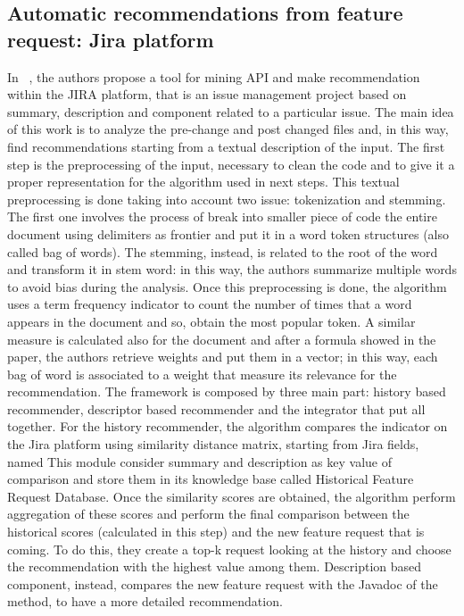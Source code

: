 \subsection{Automatic recommendations from feature request: Jira platform}
In ~\cite{thung_automatic_2013}, the authors propose a tool for mining API and make recommendation within the JIRA platform, that is an issue management project based on summary, description and component related to a particular issue. The main idea of this work is to analyze the pre-change and post changed files and, in this way, find recommendations starting from a textual description of the input. The first step is the preprocessing of the input, necessary to clean the code and to give it a proper representation for the algorithm used in next steps. This textual preprocessing is done taking into account two issue: tokenization and stemming. The first one involves the process of break into smaller piece of code the entire document using delimiters as frontier and put it in a word token structures (also called bag of words). The stemming, instead, is related to the root of the word and transform it in stem word: in this way, the authors summarize multiple words to avoid bias during the analysis. Once this preprocessing is done, the algorithm uses a term frequency indicator to count the number of times that a word appears in the document and so, obtain the most popular token. A similar measure is calculated also for the document and after a formula showed in the paper, the authors retrieve weights and put them in a vector; in this way, each bag of word is associated to a weight that measure its relevance for the recommendation. \newline
The framework is composed by three main part: history based recommender, descriptor based recommender and the integrator that put all together. For the history recommender, the algorithm compares the indicator on the Jira platform using similarity distance matrix, starting from Jira fields, named This module consider summary and description as key value of comparison and store them in its knowledge base called Historical Feature Request Database. Once the similarity scores are obtained, the algorithm perform aggregation of these scores and perform the final comparison between the historical scores (calculated in this step) and the new feature request that is coming. To do this, they create a top-k request looking at the history and choose the recommendation with the highest value among them. Description based component, instead, compares the new feature request with the Javadoc of the method, to have a more detailed recommendation. \\
